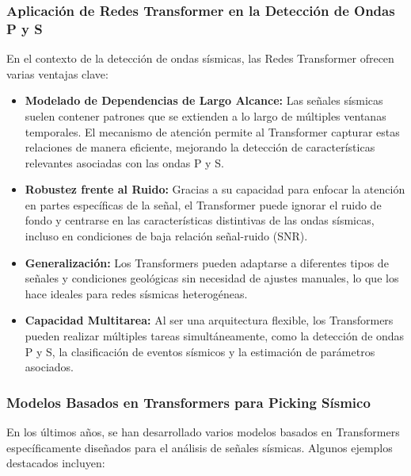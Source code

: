 \subsubsection{Aplicación de Redes Transformer en la Detección de Ondas P y S}

En el contexto de la detección de ondas sísmicas, las Redes Transformer ofrecen varias ventajas clave:

\begin{itemize}
     \item \textbf{Modelado de Dependencias de Largo Alcance:} Las señales sísmicas suelen contener patrones que se extienden a lo largo de múltiples ventanas temporales. El mecanismo de atención permite al Transformer capturar estas relaciones de manera eficiente, mejorando la detección de características relevantes asociadas con las ondas P y S.

     \item \textbf{Robustez frente al Ruido:} Gracias a su capacidad para enfocar la atención en partes específicas de la señal, el Transformer puede ignorar el ruido de fondo y centrarse en las características distintivas de las ondas sísmicas, incluso en condiciones de baja relación señal-ruido (SNR).

     \item \textbf{Generalización:} Los Transformers pueden adaptarse a diferentes tipos de señales y condiciones geológicas sin necesidad de ajustes manuales, lo que los hace ideales para redes sísmicas heterogéneas.

     \item \textbf{Capacidad Multitarea:} Al ser una arquitectura flexible, los Transformers pueden realizar múltiples tareas simultáneamente, como la detección de ondas P y S, la clasificación de eventos sísmicos y la estimación de parámetros asociados.

\end{itemize}

\subsubsection{Modelos Basados en Transformers para Picking Sísmico}

En los últimos años, se han desarrollado varios modelos basados en Transformers específicamente diseñados para el análisis de señales sísmicas. Algunos ejemplos destacados incluyen:

